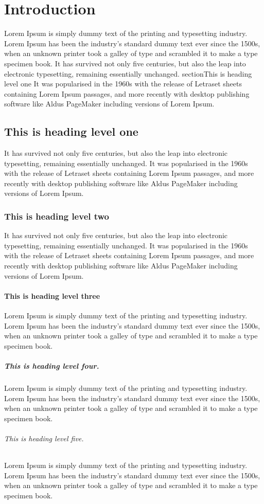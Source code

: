 \documentclass[10pt]{report}
\begin{document}
	
\chapter{Introduction}
Lorem Ipsum is simply dummy text of the printing and typesetting industry. Lorem Ipsum has been the industry's standard dummy text ever since the 1500s, when an unknown printer took a galley of type and scrambled it to make a type specimen book. It has survived not only five centuries, but also the leap into electronic typesetting, remaining essentially unchanged. 
section{This is heading level one} 
It was popularised in the 1960s with the release of Letraset sheets containing Lorem Ipsum passages, and more recently with desktop publishing software like Aldus PageMaker including versions of Lorem Ipsum.

\section{This is heading level one} 
It has survived not only five centuries, but also the leap into electronic typesetting, remaining essentially unchanged. It was popularised in the 1960s with the release of Letraset sheets containing Lorem Ipsum passages, and more recently with desktop publishing software like Aldus PageMaker including versions of Lorem Ipsum.

\subsection{This is heading level two} 
It has survived not only five centuries, but also the leap into electronic typesetting, remaining essentially unchanged. It was popularised in the 1960s with the release of Letraset sheets containing Lorem Ipsum passages, and more recently with desktop publishing software like Aldus PageMaker including versions of Lorem Ipsum.

\subsubsection{This is heading level three} 
Lorem Ipsum is simply dummy text of the printing and typesetting industry. Lorem Ipsum has been the industry's standard dummy text ever since the 1500s, when an unknown printer took a galley of type and scrambled it to make a type specimen book. 

\paragraph{This is heading level four.} 
Lorem Ipsum is simply dummy text of the printing and typesetting industry. Lorem Ipsum has been the industry's standard dummy text ever since the 1500s, when an unknown printer took a galley of type and scrambled it to make a type specimen book.

\subparagraph{This is heading level five.} 
Lorem Ipsum is simply dummy text of the printing and typesetting industry. Lorem Ipsum has been the industry's standard dummy text ever since the 1500s, when an unknown printer took a galley of type and scrambled it to make a type specimen book.
\end{document}

